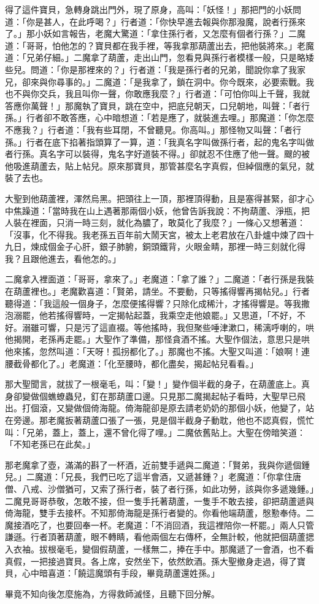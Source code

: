 得了這件寶貝，急轉身跳出門外，現了原身，高叫：「妖怪！」那把門的小妖問道：「你是甚人，在此呼喝？」行者道：「你快早進去報與你那潑魔，說者行孫來了。」那小妖如言報告，老魔大驚道：「拿住孫行者，又怎麼有個者行孫？」二魔道：「哥哥，怕他怎的？寶貝都在我手裡，等我拿那葫蘆出去，把他裝將來。」老魔道：「兄弟仔細。」二魔拿了葫蘆，走出山門，忽看見與孫行者模樣一般，只是略矮些兒。問道：「你是那裡來的？」行者道：「我是孫行者的兄弟，聞說你拿了我家兄，卻來與你尋事的。」二魔道：「是我拿了，鎖在洞中。你今既來，必要索戰。我也不與你交兵，我且叫你一聲，你敢應我麼？」行者道：「可怕你叫上千聲，我就答應你萬聲！」那魔執了寶貝，跳在空中，把底兒朝天，口兒朝地，叫聲：「者行孫。」行者卻不敢答應，心中暗想道：「若是應了，就裝進去哩。」那魔道：「你怎麼不應我？」行者道：「我有些耳閉，不曾聽見。你高叫。」那怪物又叫聲：「者行孫。」行者在底下掐著指頭算了一算，道：「我真名字叫做孫行者，起的鬼名字叫做者行孫。真名字可以裝得，鬼名字好道裝不得。」卻就忍不住應了他一聲。颼的被他吸進葫蘆去，貼上帖兒。原來那寶貝，那管甚麼名字真假，但綽個應的氣兒，就裝了去也。

大聖到他葫蘆裡，渾然烏黑。把頭往上一頂，那裡頂得動，且是塞得甚緊，卻才心中焦躁道：「當時我在山上遇著那兩個小妖，他曾告訴我說：不拘葫蘆、淨瓶，把人裝在裡面，只消一時三刻，就化為膿了，敢莫化了我麼？」一條心又想著道：「沒事，化不得我。我老孫五百年前大鬧天宮，被太上老君放在八卦爐中煉了四十九日，煉成個金子心肝，銀子肺腑，銅頭鐵背，火眼金睛，那裡一時三刻就化得我？且跟他進去，看他怎的。」

二魔拿入裡面道：「哥哥，拿來了。」老魔道：「拿了誰？」二魔道：「者行孫是我裝在葫蘆裡也。」老魔歡喜道：「賢弟，請坐。不要動，只等搖得響再揭帖兒。」行者聽得道：「我這般一個身子，怎麼便搖得響？只除化成稀汁，才搖得響是。等我撒泡溺罷，他若搖得響時，一定揭帖起蓋，我乘空走他娘罷。」又思道，「不好，不好。溺雖可響，只是污了這直裰。等他搖時，我但聚些唾津漱口，稀漓呼喇的，哄他揭開，老孫再走罷。」大聖作了準備，那怪貪酒不搖。大聖作個法，意思只是哄他來搖，忽然叫道：「天呀！孤拐都化了。」那魔也不搖。大聖又叫道：「娘啊！連腰截骨都化了。」老魔道：「化至腰時，都化盡矣，揭起帖兒看看。」

那大聖聞言，就拔了一根毫毛，叫：「變！」變作個半截的身子，在葫蘆底上。真身卻變做個蟭蟟蟲兒，釘在那葫蘆口邊。只見那二魔揭起帖子看時，大聖早已飛出。打個滾，又變做個倚海龍。倚海龍卻是原去請老奶奶的那個小妖，他變了，站在旁邊。那老魔扳著葫蘆口張了一張，見是個半截身子動耽，他也不認真假，慌忙叫：「兄弟，蓋上，蓋上，還不曾化得了哩。」二魔依舊貼上。大聖在傍暗笑道：「不知老孫已在此矣。」

那老魔拿了壺，滿滿的斟了一杯酒，近前雙手遞與二魔道：「賢弟，我與你遞個鍾兒。」二魔道：「兄長，我們已吃了這半會酒，又遞甚鍾？」老魔道：「你拿住唐僧、八戒、沙僧猶可，又索了孫行者，裝了者行孫，如此功勞，該與你多遞幾鍾。」二魔見哥哥恭敬，怎敢不接，但一隻手托著葫蘆，一隻手不敢去接，卻把葫蘆遞與倚海龍，雙手去接杯。不知那倚海龍是孫行者變的。你看他端葫蘆，慇懃奉侍。二魔接酒吃了，也要回奉一杯。老魔道：「不消回酒，我這裡陪你一杯罷。」兩人只管謙遜。行者頂著葫蘆，眼不轉睛，看他兩個左右傳杯，全無計較，他就把個葫蘆揌入衣袖。拔根毫毛，變個假葫蘆，一樣無二，捧在手中。那魔遞了一會酒，也不看真假，一把接過寶貝。各上席，安然坐下，依然飲酒。孫大聖撤身走過，得了寶貝，心中暗喜道：「饒這魔頭有手段，畢竟葫蘆還姓孫。」

畢竟不知向後怎麼施為，方得救師滅怪，且聽下回分解。
